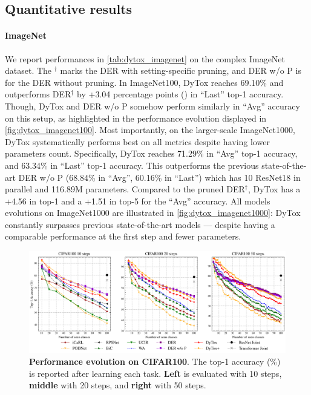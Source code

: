 \subsection{Quantitative results}

\paragraph{ImageNet}
We report performances in \autoref{tab:dytox_imagenet} on the complex ImageNet dataset. The $^\dagger$
marks the DER with setting-specific pruning, and DER w/o P is for the DER without pruning. In
ImageNet100, DyTox reaches 69.10\% and outperforms DER$^\dagger$ by +3.04 percentage points (\pp) in
``Last'' top-1 accuracy. Though, DyTox and DER w/o P somehow perform similarly in ``Avg'' accuracy
on this setup, as highlighted in the performance evolution displayed in \autoref{fig:dytox_imagenet100}.
Most importantly, on the larger-scale ImageNet1000, DyTox systematically performs best on all
metrics despite having lower parameters count. Specifically, DyTox reaches 71.29\% in ``Avg'' top-1
accuracy, and 63.34\% in ``Last'' top-1 accuracy. This outperforms the previous state-of-the-art DER
w/o P (68.84\% in ``Avg'', 60.16\% in ``Last'') which has 10 ResNet18 in parallel and 116.89M
parameters. Compared to the pruned DER$^\dagger$, DyTox has a +4.56 \pp in top-1 and a +1.51 \pp in
top-5 for the ``Avg'' accuracy. All models evolutions on ImageNet1000 are illustrated in
\autoref{fig:dytox_imagenet1000}: DyTox constantly surpasses previous state-of-the-art models --- despite
having a comparable performance at the first step and fewer parameters.



\begin{figure}[t!]
    \centering
    \includegraphics[width=1.0\linewidth]{images/dytox/cifar.png}
    \caption{\textbf{Performance evolution on CIFAR100}. The top-1 accuracy (\%) is reported after
        learning each task. \textbf{Left} is evaluated with 10 steps, \textbf{middle} with 20 steps, and
        \textbf{right} with 50 steps.}
    \label{fig:dytox_increment_cifar}
\end{figure}

